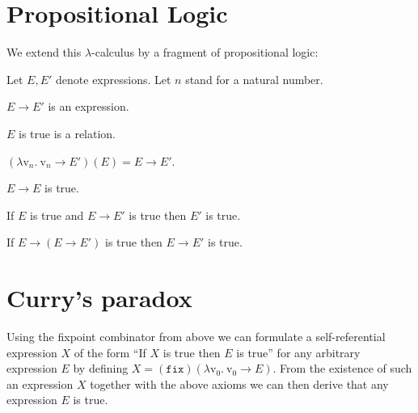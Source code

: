 \documentclass{article}
\newcommand{\var}[1]{\textrm{v}_{#1}}
\newcommand{\abs}[2]{\lambda\var{#1}.\ #2}
\newcommand{\app}[2]{(#1)(#2)}
\newcommand{\fix}{\texttt{fix}}
\begin{document}
  \section*{Propositional Logic}

  \noindent We extend this $\lambda$-calculus by a fragment of propositional
  logic:

  \begin{forthel}  
    Let $E, E'$ denote expressions.
    Let $n$ stand for a natural number.

    \begin{signature*}[title=Implication,id=implication]
      $E \rightarrow E'$ is an expression.
    \end{signature*}
  
    \begin{signature*}[title=Truth,id=truth]
      $E$ is true is a relation.
    \end{signature*}
  
    \begin{axiom*}[title=$\beta$-reduction,id=beta_reduction]
      $\app{\abs{n}{\var{n} \rightarrow E'}}{E} = E \rightarrow E'$.
    \end{axiom*}
  
    \begin{axiom*}[title=Reflexivity,id=reflexivity]
      $E \rightarrow E$ is true.
    \end{axiom*}
  
    \begin{axiom*}[title=Modus Ponens,id=modus_ponens]
      If $E$ is true and $E \rightarrow E'$ is true then $E'$ is true.
    \end{axiom*}
  
    \begin{axiom*}[title=Strengthening,id=strengthening]
      If $E \rightarrow (E \rightarrow E')$ is true then $E \rightarrow E'$ is true.
    \end{axiom*}
  \end{forthel}


  \section*{Curry's paradox}

  \noindent Using the fixpoint combinator from above we can formulate a 
  self-referential expression $X$ of the form ``If $X$ is true then $E$ is
  true'' for any arbitrary expression $E$ by defining
  $X = \app{\fix}{\abs{0}{\var{0} \rightarrow E}}$.
  From the existence of such an expression $X$ together with the above axioms 
  we can then derive that any expression $E$ is true.
\end{document}
